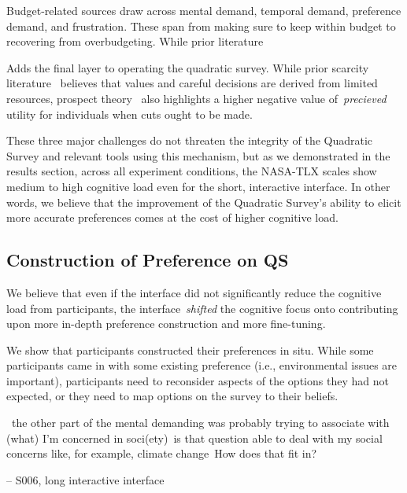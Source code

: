 Budget-related sources draw across mental demand, temporal demand, preference demand, and frustration. These span from making sure to keep within budget to recovering from overbudgeting. While prior literature 

Adds the final layer to operating the quadratic survey. While prior scarcity literature~\cite{Shah2015a} believes that values and careful decisions are derived from limited resources, prospect theory~\cite{kahnemanProspectTheoryAnalysis1979} also highlights a higher negative value of~\textit{precieved} utility for individuals when cuts ought to be made.

These three major challenges do not threaten the integrity of the Quadratic Survey and relevant tools using this mechanism, but as we demonstrated in the results section, across all experiment conditions, the NASA-TLX scales show medium to high cognitive load even for the short, interactive interface. In other words, we believe that the improvement of the Quadratic Survey's ability to elicit more accurate preferences comes at the cost of higher cognitive load.


\subsection{Construction of Preference on QS}

We believe that even if the interface did not significantly reduce the cognitive load from participants, the interface~\textit{shifted} the cognitive focus onto contributing upon more in-depth preference construction and more fine-tuning.

We show that participants constructed their preferences in situ. While some participants came in with some existing preference (i.e., environmental issues are important), participants need to reconsider aspects of the options they had not expected, or they need to map options on the survey to their beliefs.

\begin{displayquote}

~\bracketellipsis the other part of the mental demanding was probably trying to associate with (what) I'm concerned in soci(ety)~\bracketellipsis is that question able to deal with my social concerns like, for example, climate change~\bracketellipsis How does that fit in?

\noindent \hfill -- S006, long interactive interface
\end{displayquote}

